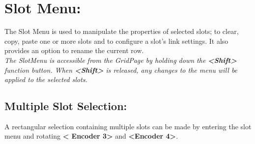 \chapter{Slot Menu:}

The Slot Menu is used to manipulate the properties of selected slots; to clear, copy, paste one or more slots and to configure a slot's link settings. It also provides an option to rename the current row.
\\
\textit{The SlotMenu is accessible from the GridPage by holding down the \textbf{<Shift>} function button. When \textbf{<Shift>} is released, any changes to the menu will be applied to the selected slots. }
\section{Multiple Slot Selection:}
A rectangular selection containing multiple slots can be made by entering the slot menu and rotating \textbf{< Encoder 3>} and \textbf{<Encoder 4>}.

